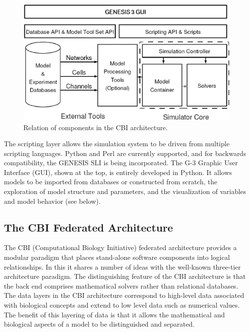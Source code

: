 \documentclass[12pt]{article}
\begin{document}
\begin{figure}[ht]
  \centering
    \includegraphics[scale=0.4]{figures/G3arch.eps}
  \caption{Relation of components in the CBI architecture.}
  \label{fig:cbi-arch}
\end{figure}

The scripting layer allows the simulation system to be driven from
multiple scripting languages. Python and Perl are currently supported,
and for backwards compatibility, the GENESIS SLI is being
incorporated. The G-3 Graphic User Interface (GUI), shown at the top,
is entirely developed in Python.  It allows models to be imported from
databases or constructed from scratch, the exploration of model
structure and parameters, and the visualization of variables and model
behavior (see below).


\subsection{The CBI Federated Architecture}
The CBI (Computational Biology Initiative) federated architecture
provides a modular paradigm that places stand-alone software
components into logical relationships. In this it shares a number of
ideas with the well-known three-tier architecture paradigm.  The
distinguishing feature of the CBI architecture is that the back end
comprises mathematical solvers rather than relational databases.  The
data layers in the CBI architecture correspond to high-level data
associated with biological concepts and extend to low level data such
as numerical values. The benefit of this layering of data is that it
allows the mathematical and biological aspects of a model to be
distinguished and separated.
\end{document}
